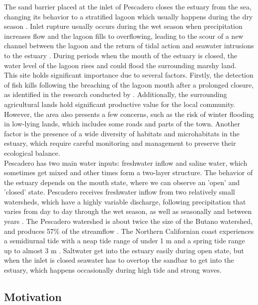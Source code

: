\documentclass[tesis.tex]{subfiles}
\begin{document}
The sand barrier placed at the inlet of Pescadero closes the estuary from the sea, changing its behavior to a stratified lagoon which usually happens during the dry season \citep{Williams2014}. Inlet rupture usually occurs during the wet season when precipitation increases flow and the lagoon fills to overflowing, leading to the scour of a new channel between the lagoon and the return of tidal action and seawater intrusions to the estuary \citep{largier2015}. During periods when the mouth of the estuary is closed, the water level of the lagoon rises and could flood the surrounding marshy land. \\

This site holds significant importance due to several factors. Firstly, the detection of fish kills following the breaching of the lagoon mouth after a prolonged closure, as identified in the research conducted by \cite{largier2015}. Additionally, the surrounding agricultural lands hold significant productive value for the local community. However, the area also presents a few concerns, such as the risk of winter flooding in low-lying lands, which includes some roads and parts of the town. Another factor is the presence of a wide diversity of habitats and microhabitats in the estuary, which require careful monitoring and management to preserve their ecological balance.\\

Pescadero has two main water inputs: freshwater inflow and saline water, which sometimes get mixed and other times form a two-layer structure. The behavior of the estuary depends on the mouth state, where we can observe an 'open' and 'closed' state. Pescadero receives freshwater inflow from two relatively small watersheds, which have a highly variable discharge, following precipitation that varies from day to day through the wet season, as well as seasonally and between years \citep{largier2015}. The Pescadero watershed is about twice the size of the Butano watershed, and produces 57\% of the streamflow \citep{Williams2014}. The Northern Californian coast experiences a semidiurnal tide with a neap tide range of under 1 m and a spring tide range up to almost 3 m \citep{Williams2014}. Saltwater get into the estuary easily during open state, but when the inlet is closed seawater has to overtop the sandbar to get into the estuary, which happens occasionally during high tide and strong waves.\\

\subsection{Motivation}
\end{document}
